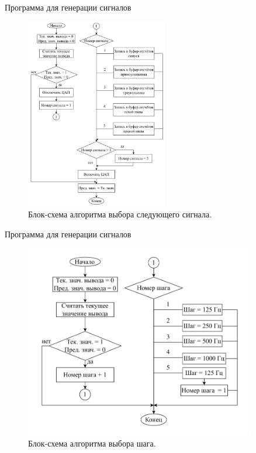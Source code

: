 \documentclass[10pt]{beamer}
\begin{document}
\begin{frame}{Программа для генерации сигналов}
  \begin{figure}
  \includegraphics[width=0.55\textwidth]{plus_signal}
  \caption{Блок-схема алгоритма выбора следующего сигнала.}
  \end{figure}
\end{frame}

\begin{frame}{Программа для генерации сигналов}
  \begin{figure}
  \includegraphics[width=0.9\textwidth]{step_select}
  \caption{Блок-схема алгоритма выбора шага.}
  \end{figure}
\end{frame}
\end{document}
